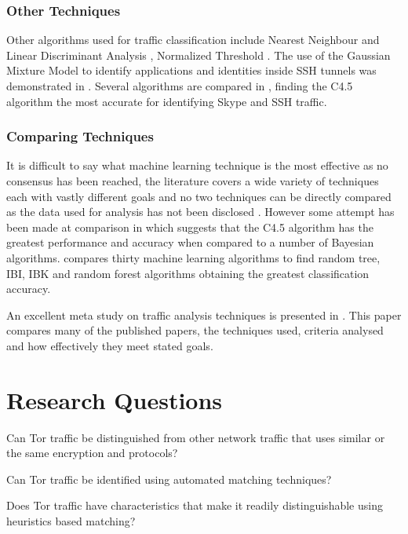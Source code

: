\documentclass{ecuthesis}
\begin{document}
\subsubsection{Other Techniques}

Other algorithms used for traffic classification include Nearest Neighbour and
Linear Discriminant Analysis \parencite{Roughan:2004p3823}, Normalized
Threshold \parencite{Crotti:2007p3824}. The use of the Gaussian Mixture Model
to identify applications and identities inside SSH tunnels was demonstrated in
\textcite{Dusi:2008p6254}. Several algorithms are compared in
\textcite{Alshammari:2009p7474}, finding the C4.5 algorithm the most accurate
for identifying Skype and SSH traffic.

\subsubsection{Comparing Techniques}

It is difficult to say what machine learning technique is the most effective as
no consensus has been reached, the literature covers a wide variety of
techniques each with vastly different goals and no two techniques can be
directly compared as the data used for analysis has not been disclosed
\parencite{Kim:2007p3867}. However some attempt has been made at comparison in
\textcite{Williams:2006p3849} which suggests that the C4.5 algorithm has the
greatest performance and accuracy when compared to a number of Bayesian
algorithms. \textcite{Mohd:2009p6484} compares thirty machine learning
algorithms  to find random tree, IBI, IBK and random forest algorithms
obtaining the greatest classification accuracy.

An excellent meta study on traffic analysis techniques is presented in
\textcite{Nguyen:2008p3837}. This paper compares many of the published papers,
the techniques used, criteria analysed and how effectively they meet stated
goals.

\section{Research Questions}

\begin{enumerate*}
  \item Can Tor traffic be distinguished from other network traffic that uses
    similar or the same encryption and protocols?
  \item Can Tor traffic be identified using automated matching techniques?
  \item Does Tor traffic have characteristics that make it readily distinguishable using
    heuristics based matching?
\end{enumerate*}
\end{document}
